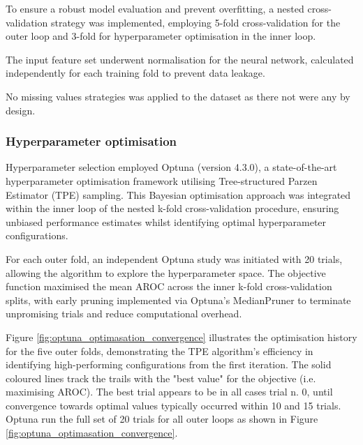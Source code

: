 To ensure a robust model evaluation and prevent overfitting, a nested cross-validation strategy was implemented, employing 5-fold cross-validation for the outer loop and 3-fold for hyperparameter optimisation in the inner loop. 

The input feature set underwent normalisation for the neural network, calculated independently for each training fold to prevent data leakage.

No missing values strategies was applied to the dataset as there not were any by design.


\subsubsection{Hyperparameter optimisation}

Hyperparameter selection employed Optuna (version 4.3.0), a state-of-the-art hyperparameter optimisation framework utilising Tree-structured Parzen Estimator (TPE) sampling. This Bayesian optimisation approach was integrated within the inner loop of the nested k-fold cross-validation procedure, ensuring unbiased performance estimates whilst identifying optimal hyperparameter configurations.

For each outer fold, an independent Optuna study was initiated with 20 trials, allowing the algorithm to explore the hyperparameter space. The objective function maximised the mean AROC across the inner k-fold cross-validation splits, with early pruning implemented via Optuna's MedianPruner to terminate unpromising trials and reduce computational overhead.

Figure \ref{fig:optuna_optimasation_convergence} illustrates the optimisation history for the five outer folds, demonstrating the TPE algorithm's efficiency in identifying high-performing configurations from the first iteration. The solid coloured lines track the trails with the "best value" for the objective (i.e. maximising AROC). The best trial appears to be in all cases trial n. 0, until convergence towards optimal values typically occurred within 10 and 15 trials. Optuna run the full set of 20 trials for all outer loops as shown in Figure \ref{fig:optuna_optimasation_convergence}.

